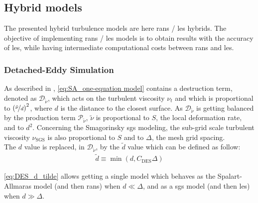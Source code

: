 \documentclass[12pt,twoside]{report}
\begin{document}




\subsection{Hybrid models}

The presented hybrid turbulence models are here \gls{rans} / \gls{les} hybrids. The objective of implementing \gls{rans} / \gls{les} models is to obtain results with the accuracy of \gls{les}, while having intermediate computational costs between \gls{rans} and \gls{les}. 

\subsubsection{Detached-Eddy Simulation}

As described in \cite{spalart_comments_1997}, \autoref{eq:SA_one-equation model} contains a destruction term, denoted as $\mathcal{D}_{\tilde{\nu}}$, which acts on the turbulent viscosity $\nu_t$ and which is proportional to $\left(\nicefrac{\tilde{\nu}}{d}\right)^2$, where $d$ is the distance to the closest surface. As $\mathcal{D}_{\tilde{\nu}}$ is getting balanced by the production term $\mathcal{P}_{\tilde{\nu}}$, $\tilde{\nu}$ is proportional to $S$, the local deformation rate, and to $d^2$. Concerning the Smagorinsky \gls{sgs} modeling, the sub-grid scale turbulent viscosity $\nu_{\text{SGS}}$ is also proportional to $S$ and to $\Delta$, the mesh grid spacing. \\
The $d$ value is replaced, in $\mathcal{D}_{\tilde{\nu}}$, by the $\tilde{d}$ value which can be defined as follow:
\begin{align}
    \tilde{d} \equiv \min \left( d,C_{\text{DES}}\Delta \right) \label{eq:DES_d_tilde}
\end{align}

\autoref{eq:DES_d_tilde} allows getting a single model which behaves as the Spalart-Allmaras model (and then \gls{rans}) when $d \ll \Delta$, and as a \gls{sgs} model (and then \gls{les}) when $d \gg \Delta$.

\clearpage
\end{document}

